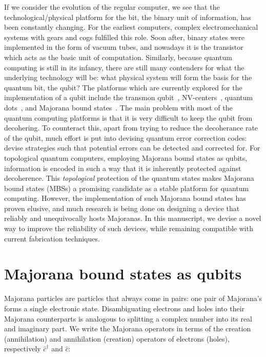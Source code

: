 	If we consider the evolution of the regular computer, we see that the technological/physical platform for the bit, the binary unit of information, has been constantly changing.
	For the earliest computers, complex electromechanical systems with gears and cogs fulfilled this role.
	Soon after, binary states were implemented in the form of vacuum tubes, and nowadays it is the transistor which acts as the basic unit of computation.
	Similarly, because quantum computing is still in its infancy, there are still many contenders for what the underlying technology will be: what physical system will form the basis for the quantum bit, the qubit?
	The platforms which are currently explored for the implementation of a qubit include the transmon qubit~\cite{wendin_quantum_2017}, NV-centers~\cite{childress_diamond_2013}, quantum dots~\cite{kloeffel_prospects_2013}, and Majorana bound states~\cite{wendin_quantum_2017}.
	The main problem with most of the quantum computing platforms is that it is very difficult to keep the qubit from decohering.
	To counteract this, apart from trying to reduce the decoherance rate of the qubit, much effort is put into devising quantum error correction codes: devise strategies such that potential errors can be detected and corrected for.
	For topological quantum computers, employing Majorana bound states as qubits, information is encoded in such a way that it is inherently protected against decoherence.
	This \emph{topological} protection of the quantum states makes Majorana bound states (MBSs) a promising candidate as a stable platform for quantum computing.
	However, the implementation of such Majorana bound states has proven elusive, and much research is being done on designing a device that reliably and unequivocally hosts Majoranas.
	In this manuscript, we devise a novel way to improve the reliability of such devices, while remaining compatible with current fabrication techniques.

\section{Majorana bound states as qubits}

	Majorana particles are particles that always come in pairs: one pair of Majorana's forms a single electronic state.
	Disambiguating electrons and holes into their Majorana counterparts is analogous to splitting a complex number into its real and imaginary part.
	We write the Majorana operators in terms of the creation (annihilation) and annihilation (creation) operators of electrons (holes), respectively $\hat{c}^\dagger$ and $\hat{c}$:

